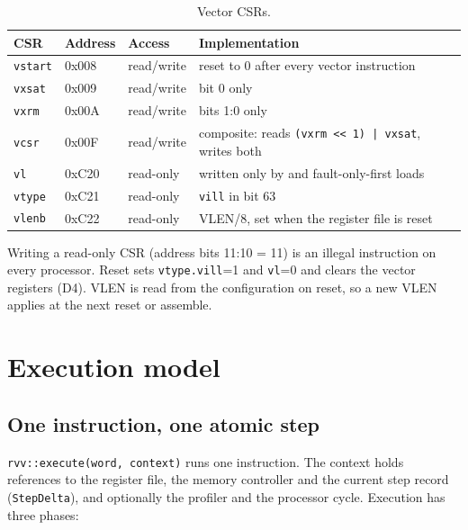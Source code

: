 \documentclass[11pt]{article}
\begin{document}
\begin{table}[H]
\centering\small
\caption{Vector CSRs.}\label{tab:csrs}
\begin{tabularx}{\textwidth}{@{}L{1.8cm}L{1.6cm}L{1.9cm}Y@{}}
\toprule
CSR & Address & Access & Implementation \\
\midrule
\texttt{vstart} & 0x008 & read/write & reset to 0 after every vector instruction \\
\texttt{vxsat}  & 0x009 & read/write & bit 0 only \\
\texttt{vxrm}   & 0x00A & read/write & bits 1:0 only \\
\texttt{vcsr}   & 0x00F & read/write & composite: reads \texttt{(vxrm << 1) | vxsat}, writes both \\
\texttt{vl}     & 0xC20 & read-only  & written only by  and fault-only-first loads \\
\texttt{vtype}  & 0xC21 & read-only  & \texttt{vill} in bit 63 \\
\texttt{vlenb}  & 0xC22 & read-only  & VLEN/8, set when the register file is reset \\
\bottomrule
\end{tabularx}
\end{table}

Writing a read-only CSR (address bits 11:10 = 11) is an illegal instruction on every processor.
Reset sets \texttt{vtype.vill}=1 and \texttt{vl}=0 and clears the vector registers (D4). VLEN is
read from the configuration on reset, so a new VLEN applies at the next reset or assemble.

\section{Execution model}\label{sec:execution}

\subsection{One instruction, one atomic step}

\texttt{rvv::execute(word, context)} runs one instruction. The context holds references to the
register file, the memory controller and the current step record (\texttt{StepDelta}), and
optionally the profiler and the processor cycle. Execution has three phases:
\end{document}
